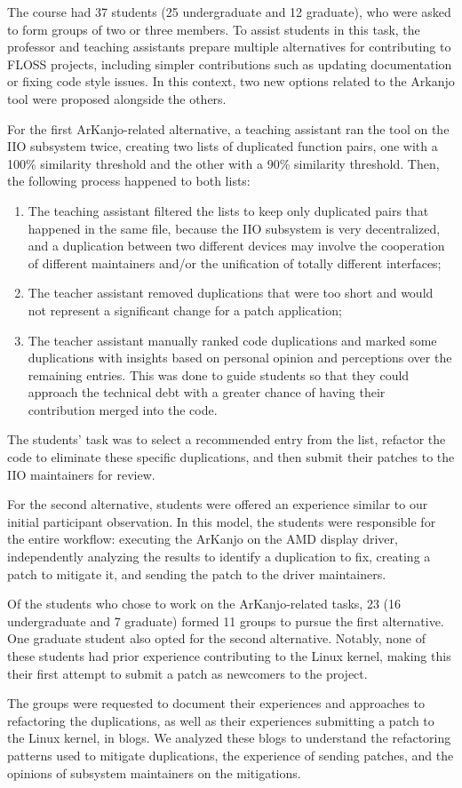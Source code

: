 The course had 37 students (25 undergraduate and 12 graduate), who were asked to form groups of
two or three members. To assist students in this task, the professor and teaching assistants prepare multiple alternatives for contributing to FLOSS projects, including simpler contributions such as updating documentation or fixing code style issues. In this context, two new options related to the
Arkanjo tool were proposed alongside the others.

For the first ArKanjo-related alternative, a teaching assistant ran the tool on the IIO subsystem twice, creating two lists of duplicated function pairs, one with a 100\% similarity threshold and the other with a 90\% similarity threshold. Then, the following process happened to both lists:

\begin{enumerate}
    \item The teaching assistant filtered the lists to keep only duplicated pairs that happened in the same file, because the IIO subsystem is very decentralized, and a duplication between two different devices may involve the cooperation of different maintainers and/or the unification of totally different interfaces;
    \item The teacher assistant removed duplications that were too short and would not represent a significant change for a patch application;
    \item The teacher assistant manually ranked code duplications and marked some duplications with insights based on personal opinion and perceptions over the remaining entries. This was done to guide students so that they could approach the technical debt with a greater chance of having their contribution merged into the code.
\end{enumerate}

The students' task was to select a recommended entry from the list, refactor the code to eliminate 
these specific duplications, and then submit their patches to the IIO maintainers for review.

For the second alternative, students were offered an experience similar to our initial participant
observation. In this model, the students were responsible for the entire workflow: executing the
ArKanjo on the AMD display driver, independently analyzing the results to identify a duplication
to fix, creating a patch to mitigate it, and sending the patch to the driver maintainers.

Of the students who chose to work on the ArKanjo-related tasks, 23 (16 undergraduate and 7 graduate)
formed 11 groups to pursue the first alternative. One graduate student also opted for the second 
alternative. Notably, none of these students had prior experience contributing to the Linux kernel, 
making this their first attempt to submit a patch as newcomers to the project.

The groups were requested to document their experiences and approaches to refactoring the duplications, as well as their experiences submitting a patch to the Linux kernel, in blogs. We analyzed these blogs to understand the refactoring patterns used to mitigate duplications, the experience of sending patches, and the opinions of subsystem maintainers on the mitigations.
